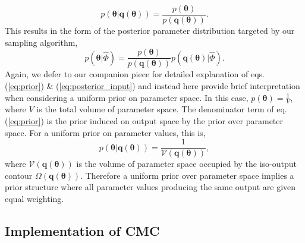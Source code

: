 %
\begin{equation}\label{eq:prior}
p(\boldsymbol{\theta}|\boldsymbol{q}(\boldsymbol{\theta})) = \frac{p(\boldsymbol{\theta})}{p(\boldsymbol{q}(\boldsymbol{\theta}))}.
\end{equation}
%
This results in the form of the posterior parameter distribution targeted by our sampling algorithm,
%
\begin{equation}\label{eq:posterior_input}
p(\boldsymbol{\theta}|\hat{\Phi}) = \frac{p(\boldsymbol{\theta})}{p(\boldsymbol{q}(\boldsymbol{\theta}))} p(\boldsymbol{q}(\boldsymbol{\theta})|\hat{\Phi}).
\end{equation}
%
Again, we defer to our companion piece \cite{lambert2018inverse} for detailed explanation of eqs. (\ref{eq:prior}) \& (\ref{eq:posterior_input}) and instead here provide brief interpretation when considering a uniform prior on parameter space. In this case, $p(\boldsymbol{\theta}) = \frac{1}{V}$, where $V$ is the total volume of parameter space. The denominator term of eq. (\ref{eq:prior}) is the prior induced on output space by the prior over parameter space. For a uniform prior on parameter values, this is,
%
\begin{equation}\label{eq:contour_volume}
p(\boldsymbol{\theta}|\boldsymbol{q}(\boldsymbol{\theta})) = \frac{1}{\mathcal{V}(\boldsymbol{q}(\boldsymbol{\theta}))},
\end{equation}
%
where $\mathcal{V}(\boldsymbol{q}(\boldsymbol{\theta}))$ is the volume of parameter space occupied by the iso-output contour $\Omega(\boldsymbol{q}(\boldsymbol{\theta}))$. Therefore a uniform prior over parameter space implies a prior structure where all parameter values producing the same output are given equal weighting.

\subsection{Implementation of CMC}

